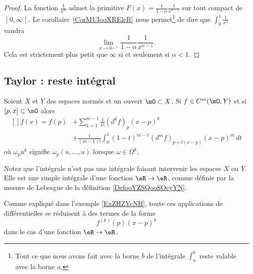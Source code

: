 \begin{proof}
La fonction \( \frac{1}{ x^{\alpha} }\) admet la primitive \( F(x)=\frac{1}{ 1-\alpha }\frac{1}{ x^{\alpha-1} }\) sur tout compact de \( \mathopen] 0 , \infty \mathclose[\). Le corollaire~\ref{CorMUIooXREleR} nous permet\footnote{Tout ce que nous avons fait avec la borne \( b\) de l'intégrale \( \int_a^b\) reste valable avec la borne \( a\).} de dire que \( \int_0^1\frac{1}{ x^{\alpha} }\) vaudra
    \begin{equation}
        \lim_{x\to 0-^+} \frac{1}{ 1-\alpha }\frac{1}{ x^{\alpha-1} }.
    \end{equation}
    Cela est strictement plus petit que \( \infty\) si et seulement si \( \alpha<1\).
\end{proof}

\subsection{Taylor : reste intégral}

\begin{proposition}\label{PropAXaSClx}
    Soient \( X\) et \( Y\) des espaces normés et un ouvert \( \mO\subset X\). Si \( f\in C^m(\mO,Y)\) et si \( [p,x]\subset \mO\) alors
    \begin{equation}
        \begin{aligned}[]
            f(x)=f(p)&+\sum_{k=1}^{m-1}\frac{1}{ k! }(d^kf)_p (x-p)^k \\
            &+\frac{1}{ (m-1)! }\int_0^1(1-t)^{m-1}(d^mf)_{ p+t(x-p) }(x-p)^m\,dt 
        \end{aligned}
    \end{equation}
    où \( \omega_pu^k\) signifie \( \omega_p(u,\ldots, u)\) lorsque \( \omega\in \Omega^k\).
\end{proposition}

Notez que l'intégrale n'est pas une intégrale faisant intervenir les espaces \( X\) ou \( Y\). Elle est une simple intégrale d'une fonction \( \eR\to \eR\), comme définie par la mesure de Lebesgue de la définition \ref{DefooYZSQooSOcyYN}.

Comme expliqué dans l'exemple \ref{ExZHZYcNH}, toute ces applications de différentielles se réduisent à des termes de la forme
\begin{equation}
    f^{(k)}(p)(x-p)^k
\end{equation}
dans le cas d'une fonction \( \eR\to\eR\).

